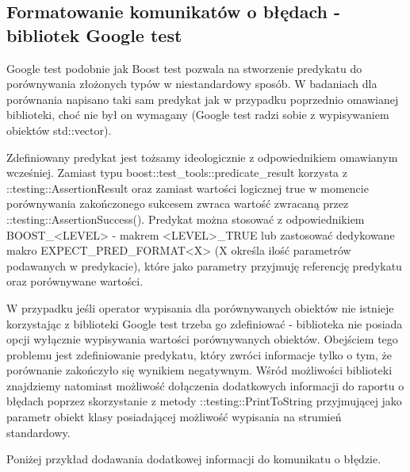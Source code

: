 \documentclass[12pt,a4paper,notitlepage]{report}
\begin{document}
\subsection{Formatowanie komunikatów o błędach - bibliotek Google test}

Google test podobnie jak Boost test pozwala na stworzenie predykatu do porównywania złożonych typów w niestandardowy sposób. W badaniach dla porównania napisano taki sam predykat jak w przypadku poprzednio omawianej biblioteki, choć nie był on wymagany (Google test radzi sobie z wypisywaniem obiektów std::vector).

Zdefiniowany predykat jest tożsamy ideologicznie z odpowiednikiem omawianym wcześniej. Zamiast typu boost::test{\_}tools::predicate{\_}result korzysta z ::testing::AssertionResult oraz zamiast wartości logicznej true w momencie porównywania zakończonego sukcesem zwraca wartość zwracaną przez ::testing::AssertionSuccess().
Predykat można stosować z odpowiednikiem BOOST{\_}<LEVEL> - makrem <LEVEL>{\_}TRUE lub zastosować dedykowane makro EXPECT{\_}PRED{\_}FORMAT<X> (X określa ilość parametrów podawanych w predykacie), które jako parametry przyjmuję referencję predykatu oraz porównywane wartości.

			

W przypadku jeśli operator wypisania dla porównywanych obiektów nie istnieje korzystając z biblioteki Google test trzeba go zdefiniować - biblioteka nie posiada opcji wyłącznie wypisywania wartości porównywanych obiektów. Obejściem tego problemu jest zdefiniowanie predykatu, który zwróci informacje tylko o tym, że porównanie zakończyło się wynikiem negatywnym.
Wśród możliwości biblioteki znajdziemy natomiast możliwość dołączenia dodatkowych informacji do raportu o błędach poprzez skorzystanie z metody ::testing::PrintToString przyjmującej jako parametr obiekt klasy posiadającej możliwość wypisania na strumień standardowy.

Poniżej przykład dodawania dodatkowej informacji do komunikatu o błędzie.

			
\end{document}
